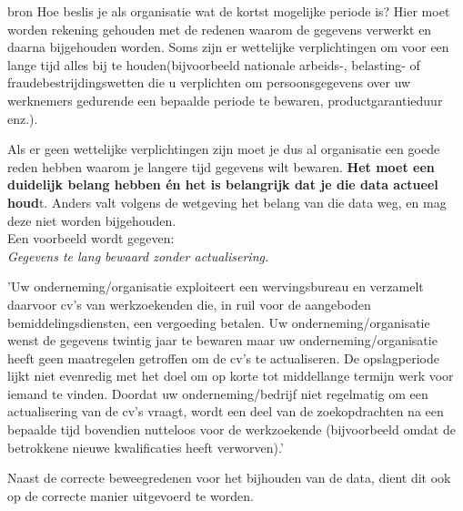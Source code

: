 
bron %
Hoe beslis je als organisatie wat de kortst mogelijke periode is? Hier moet worden rekening gehouden met de redenen waarom de gegevens verwerkt en daarna bijgehouden worden. Soms zijn er wettelijke verplichtingen om voor een lange tijd alles bij te houden(bijvoorbeeld nationale arbeids-, belasting- of fraudebestrijdingswetten die u verplichten om persoonsgegevens over uw werknemers gedurende een bepaalde periode te bewaren, productgarantieduur enz.). 

Als er geen wettelijke verplichtingen zijn moet je dus al organisatie een goede reden hebben waarom je langere tijd gegevens wilt bewaren. \textbf{Het moet een duidelijk belang hebben én het is belangrijk dat je die data actueel houd}t. Anders valt volgens de wetgeving het belang van die data weg, en mag deze niet worden bijgehouden. 
\\ Een voorbeeld wordt gegeven: 
\\ \textit{Gegevens te lang bewaard zonder actualisering.}

\setlength{\leftskip}{1cm}
'Uw onderneming/organisatie exploiteert een wervingsbureau en verzamelt daarvoor cv's van werkzoekenden die, in ruil voor de aangeboden bemiddelingsdiensten, een vergoeding betalen. Uw onderneming/organisatie wenst de gegevens twintig jaar te bewaren maar uw onderneming/organisatie heeft geen maatregelen getroffen om de cv’s te actualiseren. De opslagperiode lijkt niet evenredig met het doel om op korte tot middellange termijn werk voor iemand te vinden. Doordat uw onderneming/bedrijf niet regelmatig om een actualisering van de cv’s vraagt, wordt een deel van de zoekopdrachten na een bepaalde tijd bovendien nutteloos voor de werkzoekende (bijvoorbeeld omdat de betrokkene nieuwe kwalificaties heeft verworven).'

\setlength{\leftskip}{0pt}

Naast de correcte beweegredenen voor het bijhouden van de data, dient dit ook op de correcte manier uitgevoerd te worden. 



